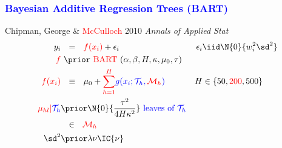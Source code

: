 \documentclass[11pt,dvipsnames,usenames,times]{beamer}
\newcommand*{\BART}{\mathrm{BART}\ }
\newcommand*{\red}[1]{\textcolor{red}{#1}}%
\begin{document}
\begin{frame}
\boldmath
\frametitle{\bf\textcolor{blue}{Bayesian Additive Regression Trees (BART)}}

Chipman, George \&  \red{McCulloch} 2010 {\it Annals of Applied Stat}\\


\begin{align*}
y_i&\ \ =\ \ \textcolor{red}{f(x_i)} + \epsilon_i &  \epsilon_i & \iid \N{0}{w_i^2 \sd^2}\\
\textcolor{red}{f} &\ \prior\ \textcolor{red}{\BART}(\alpha, \beta, H, \kappa, \mu_0, \tau) \\
\textcolor{red}{f(x_i)} &\ \ \equiv\ \ {\mu_0}+ \textcolor{red}{\sum_{h=1}^H} \textcolor{blue}{g(x_i; \mathcal{T}_h, \textcolor{red}{\mathcal{M}_h})} & 
H & \in \{50, \textcolor{red}{200}, 500\} \\ %
\textcolor{red}{\mu_{hl}|}\textcolor{blue}{\mathcal{T}_h} & \prior \N{0}{\frac{\tau^2}{4H\kappa^2 }} 
\textcolor{blue}{\mbox{\ leaves of\ }{\mathcal{T}}_h} \\
&\ \ \in\ \ \textcolor{red}{\mathcal{M}_h} \\
{\sd^2}& \prior \lambda\nu\IC{\nu}  
\end{align*}
\end{frame}
\end{document}
